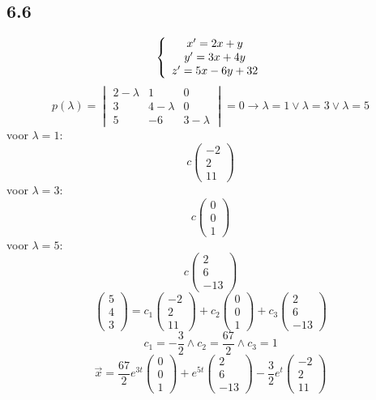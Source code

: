 \documentclass[11pt]{article}
\begin{document}
\subsection*{6.6}
\[
\left\lbrace
\begin{array}{c c}
x' = 2x+y\\
y' = 3x+4y\\
z' = 5x-6y+32
\end{array}
\right.
\]
\[
p(\lambda) =
\begin{vmatrix}
2-\lambda & 1 & 0\\
3 & 4-\lambda & 0\\
5 & -6 & 3-\lambda
\end{vmatrix}=0
\longrightarrow
\lambda=1 \vee \lambda=3 \vee \lambda=5
\]
voor $\lambda=1$:
\[
c
\begin{pmatrix}
-2 \\ 2 \\ 11
\end{pmatrix}
\]
voor $\lambda=3$:
\[
c
\begin{pmatrix}
0 \\ 0 \\ 1
\end{pmatrix}
\]
voor $\lambda=5$:
\[
c
\begin{pmatrix}
2 \\ 6 \\ -13
\end{pmatrix}
\]
\[
\begin{pmatrix}
5 \\ 4 \\ 3
\end{pmatrix}
=
c_1
\begin{pmatrix}
-2 \\ 2 \\ 11
\end{pmatrix}
+
c_2
\begin{pmatrix}
0 \\ 0 \\ 1
\end{pmatrix}
+
c_3
\begin{pmatrix}
2 \\ 6 \\ -13
\end{pmatrix}
\]
\[
c_1 = -\frac{3}{2}
\wedge
c_2 = \frac{67}{2}
\wedge
c_3 = 1
\]
\[
\vec{x}
=
\frac{67}{2}e^{3t}
\begin{pmatrix}
0 \\ 0 \\ 1
\end{pmatrix}
+ e^{5t}
\begin{pmatrix}
2 \\ 6 \\ -13
\end{pmatrix}
-\frac{3}{2}e^t
\begin{pmatrix}
-2 \\ 2 \\ 11
\end{pmatrix}
\]
\end{document}
